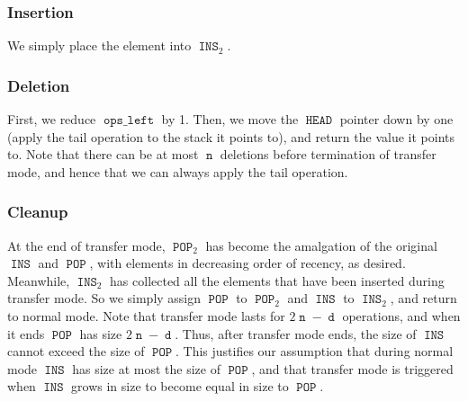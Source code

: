 \documentclass[12.5pt]{scrartcl}
\DeclareMathOperator{\INS}{\mathtt{INS}}
\DeclareMathOperator{\POP}{\mathtt{POP}}
\DeclareMathOperator{\HEAD}{\mathtt{HEAD}}
\DeclareMathOperator{\opsleft}{\mathtt{ops\_left}}
\DeclareMathOperator{\n}{\mathtt{n}}
\DeclareMathOperator{\dd}{\mathtt{d}}
\begin{document}
\subsubsection{Insertion} We simply place the element into $\INS_2$.

\subsubsection{Deletion} First, we reduce $\opsleft$ by 1. Then, we move the $\HEAD$ pointer down by one (apply the tail operation to the stack it points to), and return the value it points to. Note that there can be at most $\n$ deletions before termination of transfer mode, and hence that we can always apply the tail operation.

\subsubsection{Cleanup} At the end of transfer mode, $\POP_2$ has become the amalgation of the original $\INS$ and $\POP$, with elements in decreasing order of recency, as desired. Meanwhile, $\INS_2$ has collected all the elements that have been inserted during transfer mode. So we simply assign $\POP$ to $\POP_2$ and $\INS$ to $\INS_2$, and return to normal mode. Note that transfer mode lasts for $2\n - \dd$ operations, and when it ends $\POP$ has size $2\n - \dd$. Thus, after transfer mode ends, the size of $\INS$ cannot exceed the size of $\POP$. This justifies our assumption that during normal mode $\INS$ has size at most the size of $\POP$, and that transfer mode is triggered when $\INS$ grows in size to become equal in size to $\POP$. 

\nocite{hood}

\printbibliography
\end{document}
